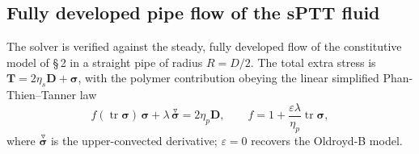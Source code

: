 
\subsection{Fully developed pipe flow of the sPTT fluid}\label{sec:sptt-pipe}

The solver is verified against the steady, fully developed flow of the
constitutive model of \S\,2 in a straight pipe of radius $R=D/2$. The total
extra stress is $\boldsymbol{T}=2\eta_s\boldsymbol{D}+\boldsymbol{\sigma}$,
with the polymer contribution obeying the linear simplified
Phan-Thien--Tanner law
\begin{equation}
  f(\operatorname{tr}\boldsymbol{\sigma})\,\boldsymbol{\sigma}
  + \lambda\,\overset{\triangledown}{\boldsymbol{\sigma}} = 2\eta_p\boldsymbol{D},
  \qquad
  f = 1 + \frac{\varepsilon\lambda}{\eta_p}\operatorname{tr}\boldsymbol{\sigma},
  \label{eq:sptt}
\end{equation}
where $\overset{\triangledown}{\boldsymbol{\sigma}}$ is the upper-convected
derivative; $\varepsilon=0$ recovers the Oldroyd-B model.

